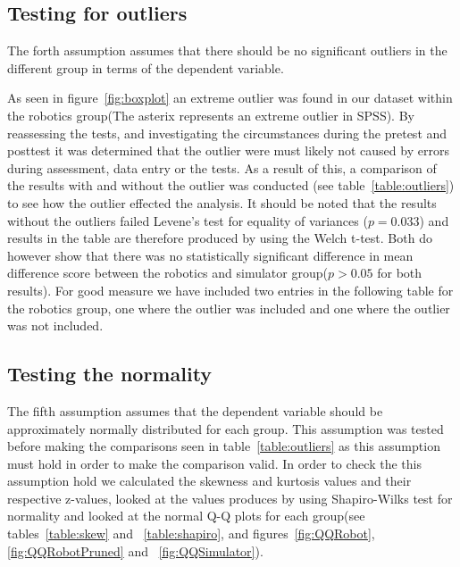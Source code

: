 \subsection{Testing for outliers}\label{sec:outliers}
The forth assumption assumes that there should be no significant outliers in the different group in terms of the dependent variable. 


\bigskip\noindent
As seen in figure~\ref{fig:boxplot} an extreme outlier was found in our dataset within the robotics group(The asterix represents an extreme outlier in SPSS). 
By reassessing the tests, and investigating the circumstances during the pretest and posttest it was determined that the outlier were must likely not caused by errors during assessment, data entry or the tests. 
As a result of this, a comparison of the results with and without the outlier was conducted (see table~\ref{table:outliers}) to see how the outlier effected the analysis. 
It should be noted that the results without the outliers failed Levene's test for equality of variances ($p = 0.033$) and results in the table are therefore produced by using the Welch t-test. 
Both do however show that there was no statistically significant difference in mean difference score between the robotics and simulator group($p > 0.05$ for both results).
For good measure we have included two entries in the following table for the robotics group, one where the outlier was included and one where the outlier was not included.


\bigskip\noindent
{}

\subsection{Testing the normality}\label{sec:normality}
The fifth assumption assumes that the dependent variable should be approximately normally distributed for each group. This assumption was tested before making the comparisons seen in table~\ref{table:outliers} as this assumption must hold in order to make the comparison valid. 
In order to check the this assumption hold we calculated the skewness and kurtosis values and their respective z-values, looked at the values produces by using Shapiro-Wilks test for normality and looked at the normal Q-Q plots for each group(see tables~\ref{table:skew} and ~\ref{table:shapiro}, and figures~\ref{fig:QQRobot},\ref{fig:QQRobotPruned} and ~\ref{fig:QQSimulator}).

